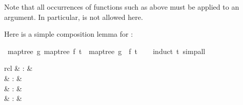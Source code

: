 \begin{isabellebody}
\begin{isamarkuptext}%
Note that all occurrences of functions such as 
  above must be applied to an argument.  In particular,  is not allowed here.%
\end{isamarkuptext}%
\isamarkuptrue%
%
\begin{isamarkuptext}%
Here is a simple composition lemma for :%
\end{isamarkuptext}%
\isamarkuptrue%
\isamarkupfalse%
\ {}map{}tree\ g\ {}map{}tree\ f\ t{}\ {}\ map{}tree\ {}g\ {}\ f{}\ t{}\isanewline
%
\isadelimproof
\ \ %
\endisadelimproof
%
\isatagproof
{}\isamarkupfalse%
\ {}induct\ t{}\ simp{}all%
\endisatagproof
{\isafoldproof}%
%
\isadelimproof
%
\endisadelimproof
%
\isamarkuptrue%
%
\begin{isamarkuptext}%
\begin{matharray}{rcl}
    \hypertarget{method.HOL.pat-completeness}{\hyperlink{method.HOL.pat-completeness}{\mbox{}}} & : &  \\
    \hypertarget{method.HOL.relation}{\hyperlink{method.HOL.relation}{\mbox{}}} & : &  \\
    \hypertarget{method.HOL.lexicographic-order}{\hyperlink{method.HOL.lexicographic-order}{\mbox{}}} & : &  \\
    \hypertarget{method.HOL.size-change}{\hyperlink{method.HOL.size-change}{\mbox{}}} & : &  \\
  \end{matharray}


\end{isamarkuptext}
\end{isabellebody}
